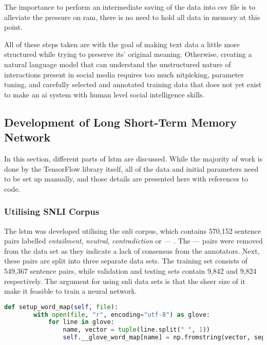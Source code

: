             The importance to perform an intermediate saving of the data into \gls{csv} file is to alleviate the pressure on \gls{ram}, there is no need to hold all data in memory at this point.
            
            All of these steps taken are with the goal of making text data a little more structured while trying to preserve its' original meaning. Otherwise, creating a natural language model that can understand the unstructured nature of interactions present in social media requires too much nitpicking, parameter tuning, and carefully selected and annotated training data that does not yet exist to make an \gls{ai} system with human level social intelligence skills.
        
    \subsection{Development of Long Short-Term Memory Network} \label{devlstm}
        In this section, different parts of \gls{lstm} are discussed. While the majority of work is done by the TensorFlow library itself, all of the data and initial parameters need to be set up manually, and those details are presented here with references to code.
    
        \subsubsection{Utilising SNLI Corpus}
            The \gls{lstm} was developed utilising the \gls{snli} corpus, which contains 570,152 sentence pairs labelled \textit{entailment}, \textit{neutral}, \textit{contradiction} or --- \autocite{Bowman2015ALA}. The --- pairs were removed from the data set as they indicate a lack of consensus from the annotators. Next, these pairs are split into three separate data sets. The training set consists of 549,367 sentence pairs, while validation and testing sets contain 9,842 and 9,824 respectively. The argument for using \gls{snli} data sets is that the sheer size of it make it feasible to train a neural network.
            
            \begin{lstlisting}[language=Python, caption=Setup of GloVe Data, label=code:glovemap]
    def setup_word_map(self, file):
        with open(file, "r", encoding="utf-8") as glove:
            for line in glove:
                name, vector = tuple(line.split(" ", 1))
                self.__glove_word_map[name] = np.fromstring(vector, sep=" ")
            \end{lstlisting}
            \FloatBarrier
        
